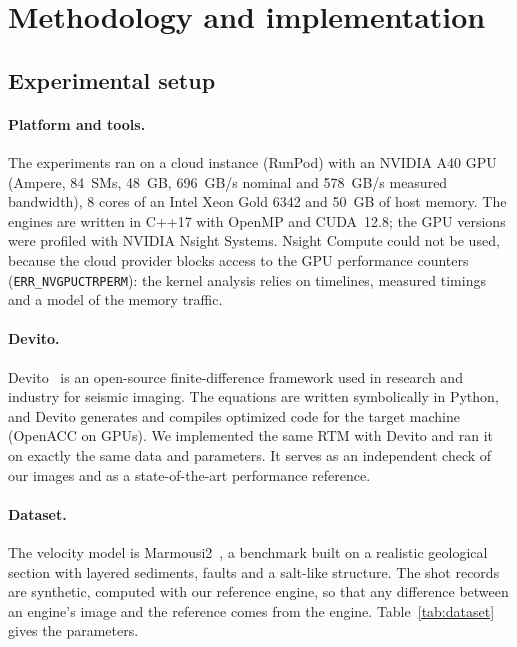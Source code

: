\documentclass[letterpaper,11pt,leqno]{article}
\begin{document}
\section{Methodology and implementation}\label{s:methodology}

\subsection{Experimental setup}

\paragraph{Platform and tools.} The experiments ran on a cloud instance (RunPod) with an NVIDIA A40 GPU (Ampere, 84~SMs, 48~GB, 696~GB/s nominal and 578~GB/s measured bandwidth), 8 cores of an Intel Xeon Gold 6342 and 50~GB of host memory. The engines are written in C++17 with OpenMP and CUDA~12.8; the GPU versions were profiled with NVIDIA Nsight Systems. Nsight Compute could not be used, because the cloud provider blocks access to the GPU performance counters (\texttt{ERR\_NVGPUCTRPERM}): the kernel analysis relies on timelines, measured timings and a model of the memory traffic.

\paragraph{Devito.} Devito~\citep{Louboutin2019Devito, Luporini2020Devito} is an open-source finite-difference framework used in research and industry for seismic imaging. The equations are written symbolically in Python, and Devito generates and compiles optimized code for the target machine (OpenACC on GPUs). We implemented the same RTM with Devito and ran it on exactly the same data and parameters. It serves as an independent check of our images and as a state-of-the-art performance reference.

\paragraph{Dataset.} The velocity model is Marmousi2~\citep{Martin2006Marmousi2}, a benchmark built on a realistic geological section with layered sediments, faults and a salt-like structure. The shot records are synthetic, computed with our reference engine, so that any difference between an engine's image and the reference comes from the engine. Table~\ref{tab:dataset} gives the parameters.
\end{document}
